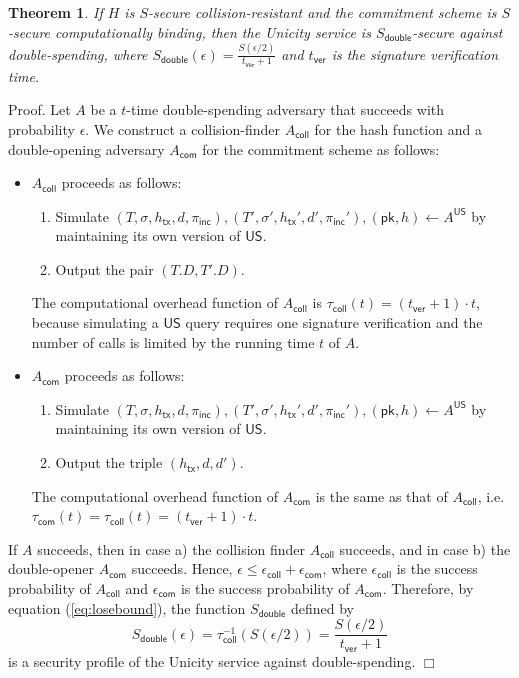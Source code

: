 \documentclass{article}
\newtheorem{theorem}{Theorem}[section]
\newenvironment{proof}{\textsf{Proof}.}{\hfill$\Box$}
\newcommand{\pubkey}[0]{\mathsf{pk}}
\newcommand{\unisrv}[0]{\mathsf{US}}
\newcommand{\txhash}[0]{{h_\mathsf{tx}}}
\newcommand{\pinc}[0]{{\pi_{\mathsf{inc}}}}
\begin{document}
\begin{theorem}
If $H$ is $S$-secure collision-resistant and the commitment scheme is $S$-secure computationally binding, then the Unicity service is $S_\mathsf{double}$-secure against double-spending, where
$S_\mathsf{double}(\epsilon) = \frac{S(\epsilon/2)}{t_\mathsf{ver}+1}$
and $t_\mathsf{ver}$ is the signature verification time.
\end{theorem}
\begin{proof}
Let $A$ be a $t$-time double-spending adversary that succeeds with probability $\epsilon$. We construct a collision-finder $A_\mathsf{coll}$ for the hash function and a double-opening adversary $A_\mathsf{com}$ for the commitment scheme as follows:
\begin{itemize}
\item $A_\mathsf{coll}$ proceeds as follows:
\begin{enumerate}
\item Simulate $(T,\sigma,\txhash,d,\pinc),(T',\sigma',\txhash',d',\pinc'),(\pubkey,h)\gets A^\unisrv$ by maintaining its own version of $\unisrv$.
\item Output the pair $(T.D,T'.D)$.
\end{enumerate}
The computational overhead function of $A_\mathsf{coll}$ is $\tau_\mathsf{coll}(t) = (t_\mathsf{ver}+1) \cdot t$, because simulating a $\unisrv$ query requires one signature verification and the number of calls is limited by the running time $t$ of $A$.
\item $A_\mathsf{com}$ proceeds as follows:
\begin{enumerate}
\item Simulate $(T,\sigma,\txhash,d,\pinc),(T',\sigma',\txhash',d',\pinc'),(\pubkey,h)\gets A^\unisrv$ by maintaining its own version of $\unisrv$.
\item Output the triple $(\txhash,d,d')$.
\end{enumerate}
The computational overhead function of $A_\mathsf{com}$ is the same as
that of $A_\mathsf{coll}$, i.e. $\tau_\mathsf{com}(t)= \tau_\mathsf{coll}(t)=(t_\mathsf{ver}+1) \cdot t$.
\end{itemize}
 If $A$ succeeds, then in case a) the collision finder $A_\mathsf{coll}$ succeeds, and in case b) the double-opener $A_\mathsf{com}$ succeeds. Hence, $\epsilon \le \epsilon_\mathsf{coll} + \epsilon_\mathsf{com}$, where $\epsilon_\mathsf{coll}$ is the success probability of $A_\mathsf{coll}$ and
$\epsilon_\mathsf{com}$ is the success probability of $A_\mathsf{com}$.
Therefore, by equation (\ref{eq:losebound}), the function $S_\mathsf{double}$ defined by
\[
S_\mathsf{double}(\epsilon) = \tau^{-1}_\mathsf{coll}(S(\epsilon/2)) =
\frac{S(\epsilon/2)}{t_\mathsf{ver}+1}
\]
is a security profile of the Unicity service against double-spending.
\end{proof}
\end{document}
